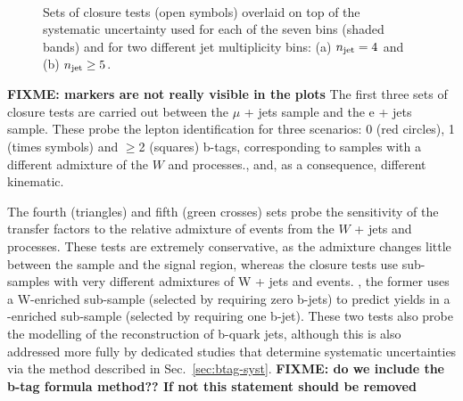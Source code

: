 \begin{figure}[h!]
\begin{center}
     \\
    \caption{Sets of closure tests (open symbols) overlaid on top of
      the systematic uncertainty used for each of the seven \scalht
      bins (shaded bands) and for two different jet
      multiplicity bins: (a) $\njet = 4$ and (b) $\njet \geq5$.}
    \label{fig:closure}
  \end{center} 
\end{figure}

\textbf{FIXME: markers are not really visible in the plots}
The first three sets of closure tests are carried out between the $\mu$ 
+ jets sample and the e + jets sample. These probe the lepton 
identification for three scenarios: 0 (red circles), 
1 (times symbols) and $\geq$2 (squares) b-tags, corresponding to samples with a different admixture of the $W$ and \ttbar processes., 
and, as a consequence, different kinematic. 

The fourth (triangles) and fifth (green crosses) sets probe the
sensitivity of the transfer factors to the relative admixture of
events from the $W$ + jets and \ttbar processes. These tests are
extremely conservative, as the admixture changes little between the
\mj sample and the signal region, whereas the closure tests use
sub-samples with very different admixtures of W + jets and \ttbar
events. \eg, the former uses a W-enriched sub-sample (selected by
requiring zero b-jets) to predict yields in a \ttbar-enriched
sub-sample (selected by requiring one b-jet). These two tests also
probe the modelling of the reconstruction of b-quark jets, although
this is also addressed more fully by dedicated studies that determine
systematic uncertainties via the method described in
Sec.~\ref{sec:btag-syst}. \textbf{FIXME: do we include the b-tag formula method?? If not this statement should be removed}


